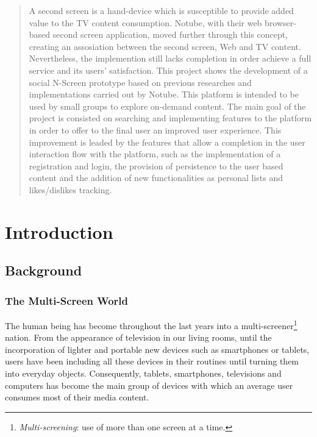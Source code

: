 \documentclass{acm_proc_article-sp}
\begin{document}
\maketitle
\begin{abstract}
A second screen is a hand-device which is susceptible to provide added value to the TV content consumption. Notube, with their web browser-based second screen application, moved further through this concept, creating an assosiation between the second screen, Web and TV content. Nevertheless, the implemention still lacks completion in order achieve a full service and its users' satisfaction.
This project shows the development of a social N-Screen prototype based on previous researches and implementations carried out by Notube. This platform is intended to be used by small groups to explore on-demand content. The main goal of the project is consisted on searching and implementing features to the platform in order to offer to the final user an improved user experience. This improvement is leaded by the features that allow a completion in the user interaction flow with the platform, such as the implementation of a registration and login, the provision of persistence to the user based content and the addition of new functionalities as personal lists and likes/dislikes tracking.
\end{abstract}

\section{Introduction}

\subsection{Background}

\subsubsection{The Multi-Screen World}

The human being has become throughout the last years into a multi-screener\footnote{\textit{Multi-screening}: use of 
more than one screen at a time.} nation. From the appearance of television in our living rooms, until the incorporation of lighter and portable new devices such as smartphones or tablets, users have been including all these devices in their routines until turning them into everyday objects. Consequently, tablets, smartphones, televisions and computers has become the main group of devices with which an average user consumes most of their media content\cite{multiscreen:google}. 
\end{document}
